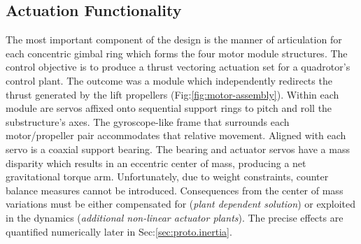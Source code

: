 \subsection{Actuation Functionality}
\label{subsec:proto.design.actuation}
The most important component of the design is the manner of articulation for each concentric gimbal ring which forms the four motor module structures. The control objective is to produce a thrust vectoring actuation set for a quadrotor's control plant. The outcome was a module which independently redirects the thrust generated by the lift propellers (Fig:\ref{fig:motor-assembly}). Within each module are servos affixed onto sequential support rings to pitch and roll the substructure's axes. The gyroscope-like frame that surrounds each motor/propeller pair accommodates that relative movement. Aligned with each servo is a coaxial support bearing. The bearing and actuator servos have a mass disparity which results in an eccentric center of mass, producing a net gravitational torque arm. Unfortunately, due to weight constraints, counter balance measures cannot be introduced. Consequences from the center of mass variations must be either compensated for (\emph{plant dependent solution}) or exploited in the dynamics (\emph{additional non-linear actuator plants}). The precise effects are quantified numerically later in Sec:\ref{sec:proto.inertia}.
\par
